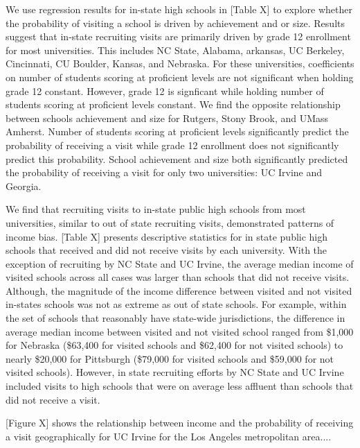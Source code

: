 \documentclass[twoside]{article}
\begin{document}
We use regression results for in-state high schools in [Table X] to explore whether the probability of visiting a school is driven by achievement and or size. Results suggest that in-state recruiting visits are primarily driven by grade 12 enrollment for most universities. This includes NC State, Alabama, arkansas, UC Berkeley, Cincinnati, CU Boulder, Kansas, and Nebraska. For these universities, coefficients on number of students scoring at proficient levels are not significant when holding grade 12 constant. However,  grade 12 is signficant while holding number of students scoring at proficient levels constant. We find the opposite relationship between schools achievement and size for Rutgers, Stony Brook, and UMass Amherst. Number of students scoring at proficient levels significantly predict the probability of receiving a visit while grade 12 enrollment does not significantly predict this probability. School achievement and size both significantly predicted the probability of receiving a visit for only two universities: UC Irvine and Georgia.

We find that recruiting visits to in-state public high schools from most universities, similar to out of state recruiting visits, demonstrated patterns of income bias. [Table X] presents descriptive statistics for in state public high schools that received and did not receive visits by each university.  With the exception of recruiting by NC State and UC Irvine, the average median income of visited schools across all cases was larger than schools that did not receive visits. Although, the magnitude of the income difference between visited and not visited in-states schools was not as extreme as out of state schools. For example, within the set of schools that reasonably have state-wide jurisdictions, the difference in average median income between visited and not visited school ranged from \$1,000 for Nebraska (\$63,400 for visited schools and \$62,400 for not visited schools) to nearly \$20,000 for Pittsburgh (\$79,000 for visited schools and \$59,000 for not visited schools). However, in state recruiting efforts by NC State and UC Irvine included visits to high schools that were on average less affluent than schools that did not receive a visit.

[Figure X] shows the relationship between income and the probability of receiving a visit geographically for UC Irvine for the Los Angeles metropolitan area....
\end{document}
